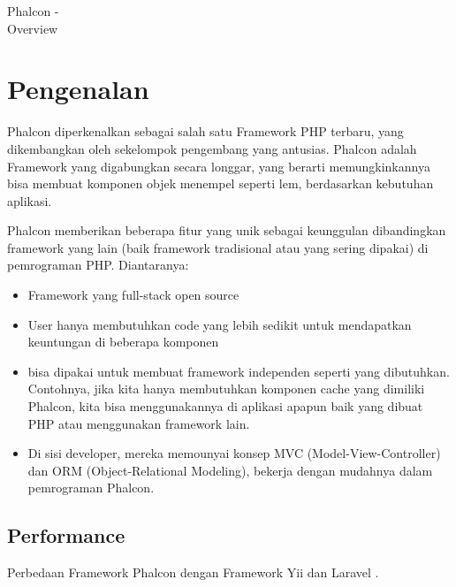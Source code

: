 {Phalcon -\\ Overview}
\section{Pengenalan}
Phalcon diperkenalkan sebagai salah satu Framework PHP terbaru, yang dikembangkan oleh sekelompok pengembang yang antusias. Phalcon adalah Framework yang digabungkan secara longgar, yang berarti memungkinkannya bisa membuat komponen objek menempel seperti lem, berdasarkan kebutuhan aplikasi.

Phalcon memberikan beberapa fitur yang unik sebagai keunggulan dibandingkan framework yang lain (baik framework tradisional atau yang sering dipakai) di pemrograman PHP. Diantaranya:

\begin{itemize}
 \item Framework yang full-stack open source

 \item User hanya membutuhkan code yang lebih sedikit untuk mendapatkan keuntungan di beberapa komponen

 \item bisa dipakai untuk membuat framework independen seperti yang dibutuhkan. Contohnya, jika kita hanya membutuhkan komponen cache yang dimiliki Phalcon, kita bisa menggunakannya di aplikasi apapun baik yang dibuat PHP atau menggunakan framework lain.

 \item Di sisi developer, mereka memounyai konsep MVC (Model-View-Controller) dan ORM (Object-Relational Modeling), bekerja dengan mudahnya dalam pemrograman Phalcon.
 \end{itemize}

\subsection{Performance}

Perbedaan Framework Phalcon dengan Framework Yii dan Laravel \cite{prokofyeva2017analysis}.

